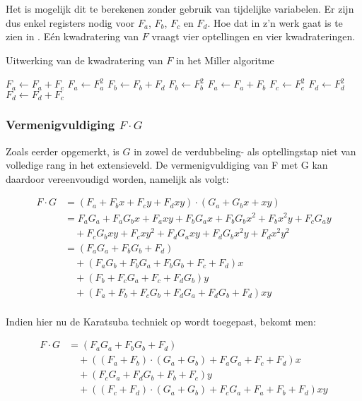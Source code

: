 Het is mogelijk dit te berekenen zonder gebruik van tijdelijke variabelen. Er zijn dus enkel registers nodig voor $F_a$, $F_b$, $F_c$ en $F_d$. Hoe dat in z'n werk gaat is te zien in . E\'en kwadratering van $F$ vraagt vier optellingen en vier kwadrateringen.

\begin{algorithm}[h]
	\caption{Uitwerking van de kwadratering van $F$ in het Miller algoritme}
	\label{algoritme-implementatie-miller-f-square}
	$F_a \leftarrow F_a + F_c$\;
	$F_a \leftarrow F_a^2$\;
	$F_b \leftarrow F_b + F_d$\;
	$F_b \leftarrow F_b^2$\;
	$F_a \leftarrow F_a + F_b$\;
	$F_c \leftarrow F_c^2$\;
	$F_d \leftarrow F_d^2$\;
	$F_d \leftarrow F_d + F_c$\;
\end{algorithm}

\subsubsection{Vermenigvuldiging $F \cdot G$}

Zoals eerder opgemerkt, is $G$ in zowel de verdubbeling- als optellingstap niet van volledige rang in het extensieveld. De vermenigvuldiging van F met G kan daardoor vereenvoudigd worden, namelijk als volgt:

\[\begin{aligned}
F \cdot G	&= (F_a + F_b x + F_c y + F_d xy) \cdot (G_a + G_b x + xy)\\
	&= F_a G_a + F_a G_b x + F_a xy + F_b G_a x + F_b G_b x^2 + F_b x^2y + F_c G_a y\\
		&\quad + F_c G_b xy + F_c xy^2 + F_d G_a xy + F_d G_b x^2y + F_d x^2 y^2\\
	&= (F_a G_a + F_b G_b + F_d)\\
		&\quad + (F_a G_b + F_b G_a + F_b G_b + F_c + F_d)x\\
		&\quad + (F_b + F_c G_a + F_c + F_d G_b)y\\
		&\quad + (F_a + F_b + F_c G_b + F_d G_a + F_d G_b + F_d)xy\\
\end{aligned}\]

Indien hier nu de Karatsuba techniek op wordt toegepast, bekomt men:

\[\begin{aligned}
F \cdot G &= (F_a G_a + F_b G_b + F_d)\\
				&\quad + ((F_a + F_b) \cdot (G_a + G_b) + F_a G_a + F_c + F_d)x\\
				&\quad + (F_c G_a + F_d G_b + F_b + F_c)y\\
				&\quad + ((F_c + F_d) \cdot (G_a + G_b) + F_c G_a + F_a + F_b + F_d)xy\\
\end{aligned}\]

